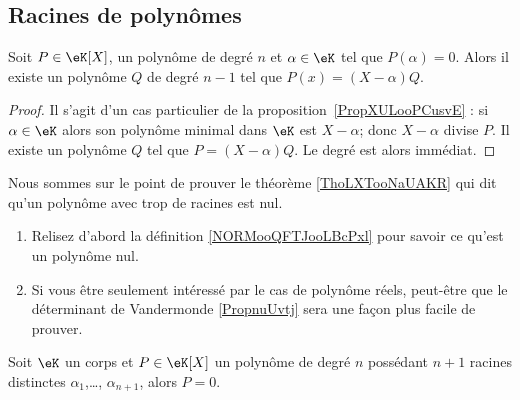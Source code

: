 \subsection{Racines de polynômes}

\begin{corollary}   \label{CorDIYooEtmztc}
	Soit \( P\in \eK[X]\), un polynôme de degré \( n\) et \( \alpha\in \eK\) tel que \( P(\alpha)=0\). Alors il existe un polynôme \( Q\) de degré \( n-1\) tel que \( P(x)=(X-\alpha)Q\).
\end{corollary}

\begin{proof}
	Il s'agit d'un cas particulier de la proposition~\ref{PropXULooPCusvE} : si \( \alpha\in \eK\) alors son polynôme minimal dans \( \eK\) est \( X-\alpha\); donc \( X-\alpha\) divise \( P\). Il existe un polynôme \( Q\) tel que \( P=(X-\alpha)Q\). Le degré est alors immédiat.
\end{proof}


Nous sommes sur le point de prouver le théorème \ref{ThoLXTooNaUAKR} qui dit qu'un polynôme avec trop de racines est nul.
\begin{enumerate}
	\item
	      Relisez d'abord la définition \ref{NORMooQFTJooLBcPxl} pour savoir ce qu'est un polynôme nul.
	\item
	      Si vous être seulement intéressé par le cas de polynôme réels, peut-être que le déterminant de Vandermonde \ref{PropnuUvtj} sera une façon plus facile de prouver.
\end{enumerate}

\begin{theorem}\label{ThoLXTooNaUAKR}
	Soit \( \eK\) un corps et \( P\in \eK[X]\) un polynôme de degré \( n\) possédant \( n+1\) racines distinctes \( \alpha_1\),\ldots, \( \alpha_{n+1}\), alors \( P=0\).
\end{theorem}

